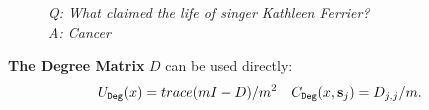 \begin{block}{\color{mydarkgreen}{Estimating $U$ and $C$ from Similarities}}
\begin{figure}
\begin{minipage}{0.47\textwidth}
{\scriptsize\textit{Q: What claimed the life of singer Kathleen Ferrier?\\ A: Cancer}}
\end{minipage}
    \label{fig:eigv}
\end{figure}
\endtcolorbox


\tcolorbox[colback=white, colframe=black, boxrule=1pt]

\textbf{The Degree Matrix} $D$ can be used directly:
\begin{align}
    &U_{\texttt{Deg}}(x) = trace(mI-D)/m^2
    &C_{\texttt{Deg}}(x, \mathbf{s}_j) = D_{j,j}/m.
\end{align}
\endtcolorbox




\end{block}
